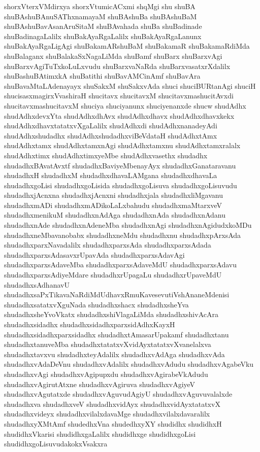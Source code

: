 {shorxVterxVMdirxya
shorxVtumicACxmi
shqMgi
shu
shuBA
shuBAshuBAnuSAThxnamayaM
shuBAshuBa
shuBAshuBaM
shuBAshuBavAsanAruSitaM
shuBAvahada
shuBa
shuBadinade
shuBadinagaLalilx
shuBakAyaRgaLalilx
shuBakAyaRgaLanunx
shuBakAyaRgaLigAgi
shuBakamARshuBaM
shuBakamaR
shuBakamaRdiMda
shuBalaganx
shuBalakaSxNagaLiMda
shuBamf
shuBarx
shuBarxvAgi
shuBarxvAgiTuTxkoLuLxvudu
shuBarxvaNaRda
shuBarxvasatxrXdalilx
shuBashuBAtimxkA
shuBatithi
shuBavAMCinAmf
shuBavAra
shuBavaMtaLAdenayayx
shuSakxM
shuSakxvAda
shuci
shuciBURtanAgi
shuciH
shucisasxmagirxVvashiraH
shucitavx
shucitavxM
shucitavxmashucitAvxdi
shucitavxmashucitavxM
shuciya
shuciyanunx
shuciyenanxde
shucw
shudAdhx
shudAdhxdevxYta
shudAdhxdhAvx
shudAdhxdhavx
shudAdhxdhavxkekx
shudAdhxdhavxtatatxvXgaLalilx
shudAdhxdi
shudAdhxnanadeyAdi
shudAdhxshudadhx
shudAdhxshudadhxviBeVdataH
shudAdhxtAmx
shudAdhxtamx
shudAdhxtamxnAgi
shudAdhxtamxnu
shudAdhxtamxralalx
shudAdhxtimx
shudAdhxtimxyeMbe
shudAdhxvasethx
shudadhx
shudadhxBAvatAvxtf
shudadhxBaviyeMbenayAyx
shudadhxGanataravanu
shudadhxH
shudadhxM
shudadhxdhavaLAMgana
shudadhxdhavaLa
shudadhxgoLisi
shudadhxgoLisida
shudadhxgoLisuva
shudadhxgoLisuvudu
shudadhxjAcnxna
shudadhxjAcnxni
shudadhxjala
shudadhxliMgavanu
shudadhxmADi
shudadhxmADikoLaLxbahudu
shudadhxmaMtarxveV
shudadhxmenikuM
shudadhxnAdAga
shudadhxnAda
shudadhxnAdanu
shudadhxnAde
shudadhxnAdeneMba
shudadhxnAgi
shudadhxnAgidudxkoMDu
shudadhxneMbavanobabx
shudadhxneMdu
shudadhxnu
shudadhxpArxsAda
shudadhxparxNavadalilx
shudadhxparxsAda
shudadhxparxsAdada
shudadhxparxsAdasavxrUpavAda
shudadhxparxsAdavAgi
shudadhxparxsAdaveMba
shudadhxparxsAdaveMdU
shudadhxparxsAdavu
shudadhxparxsAdiyeMdare
shudadhxrUpagaLu
shudadhxrUpaveMdU
shudadhxsAdhanavU
shudadhxsaPxTikavaNaRdiMdUdhavxRmuKavesevutiVshAnaneMdenisi
shudadhxsatatxvXguNada
shudadhxshacx
shudadhxsheYva
shudadhxsheYvoVkatx
shudadhxshiVlagaLiMda
shudadhxshivAcAra
shudadhxsidadhx
shudadhxsidadhxparxsidAdhxKayxH
shudadhxsidadhxparxsidadhx
shudadhxtAmasarUpakamf
shudadhxtanu
shudadhxtanuveMba
shudadhxtatatxvXvidAyxtatatxvXvanelalxva
shudadhxtavxvu
shudadhxteyAdalilx
shudadhxvAdAga
shudadhxvAda
shudadhxvAdaDeVnu
shudadhxvAdalilx
shudadhxvAdudu
shudadhxvAgabeVku
shudadhxvAgi
shudadhxvAgipupxdu
shudadhxvAgirabeVkAdudu
shudadhxvAgirutAtxne
shudadhxvAgiruva
shudadhxvAgiyeV
shudadhxvAgutatxde
shudadhxvAguvudAgiyU
shudadhxvAguvuvalalxde
shudadhxva
shudadhxveV
shudadhxvidAyx
shudadhxvidAyxtatatxvX
shudadhxvideyx
shudadhxvilalxdavaMge
shudadhxvilalxdavaralilx
shudadhxyXMtAmf
shudedhxVna
shudedhxyXY
shudidhx
shudidhxH
shudidhxVkarisi
shudidhxgaLalilx
shudidhxge
shudidhxgoLisi
shudidhxgoLisuvudakokxVsakxra
}
